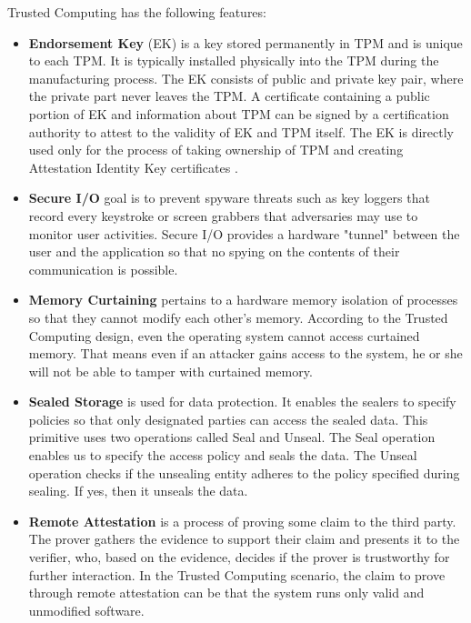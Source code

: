 Trusted Computing has the following features:

\begin{itemize}

\item \textbf{Endorsement Key} (EK) is a key stored permanently in TPM and is unique to each TPM. It is typically installed physically into the TPM during the manufacturing process. The EK consists of public and private key pair, where the private part never leaves the TPM. A certificate containing a public portion of EK and information about TPM can be signed by a certification authority to attest to the validity of EK and TPM itself. The EK is directly used only for the process of taking ownership of TPM and creating Attestation Identity Key  certificates \cite[p.~179-180]{Tomlinson2017}.

\item \textbf{Secure I/O} goal is to prevent spyware threats such as key loggers that record every keystroke or screen grabbers that adversaries may use to monitor user activities. Secure I/O provides a hardware "tunnel" between the user and the application so that no spying on the contents of their communication is possible.

\item \textbf{Memory Curtaining} pertains to a hardware memory isolation of processes so that they cannot modify each other's memory. According to the Trusted Computing design, even the operating system cannot access curtained memory. That means even if an attacker gains access to the system, he or she will not be able to tamper with curtained memory.

\item \textbf{Sealed Storage} is used for data protection. It enables the sealers to specify policies so that only designated parties can access the sealed data. This primitive uses two operations called Seal and Unseal. The Seal operation enables us to specify the access policy and seals the data. The Unseal operation checks if the unsealing entity adheres to the policy specified during sealing. If yes, then it unseals the data.

\item \textbf{Remote Attestation} is a process of proving some claim to the third party. The prover gathers the evidence to support their claim and presents it to the verifier, who, based on the evidence, decides if the prover is trustworthy for further interaction. In the Trusted Computing scenario, the claim to prove through remote attestation can be that the system runs only valid and unmodified software. 

\end{itemize}


